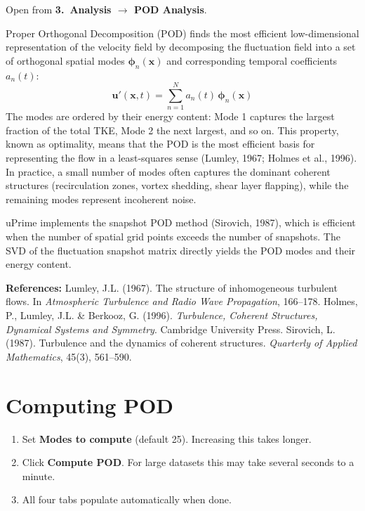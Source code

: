 \documentclass[11pt, a4paper]{report}
\newcommand{\uipth}[1]{\textbf{\textcolor{upblue}{#1}}}
\begin{document}
Open from \uipth{3.\ Analysis $\to$ POD Analysis}.

Proper Orthogonal Decomposition (POD) finds the most efficient low-dimensional representation of the velocity field by decomposing the fluctuation field into a set of orthogonal spatial modes $\boldsymbol{\phi}_n(\mathbf{x})$ and corresponding temporal coefficients $a_n(t)$:
\[
\mathbf{u}'(\mathbf{x}, t) = \sum_{n=1}^{N} a_n(t)\,\boldsymbol{\phi}_n(\mathbf{x})
\]
The modes are ordered by their energy content: Mode 1 captures the largest fraction of the total TKE, Mode 2 the next largest, and so on. This property, known as optimality, means that the POD is the most efficient basis for representing the flow in a least-squares sense (Lumley, 1967; Holmes et al., 1996). In practice, a small number of modes often captures the dominant coherent structures (recirculation zones, vortex shedding, shear layer flapping), while the remaining modes represent incoherent noise.

uPrime implements the snapshot POD method (Sirovich, 1987), which is efficient when the number of spatial grid points exceeds the number of snapshots. The SVD of the fluctuation snapshot matrix directly yields the POD modes and their energy content.

\noindent\textbf{References:} Lumley, J.L. (1967). The structure of inhomogeneous turbulent flows. In \textit{Atmospheric Turbulence and Radio Wave Propagation}, 166--178. Holmes, P., Lumley, J.L. \& Berkooz, G. (1996). \textit{Turbulence, Coherent Structures, Dynamical Systems and Symmetry}. Cambridge University Press. Sirovich, L. (1987). Turbulence and the dynamics of coherent structures. \textit{Quarterly of Applied Mathematics}, 45(3), 561--590.

\section{Computing POD}

\begin{stepbox}
\begin{enumerate}[leftmargin=1.5em, topsep=2pt]
  \item Set \uipth{Modes to compute} (default 25). Increasing this takes longer.
  \item Click \uipth{Compute POD}. For large datasets this may take several seconds to a minute.
  \item All four tabs populate automatically when done.
\end{enumerate}
\end{stepbox}
\end{document}
